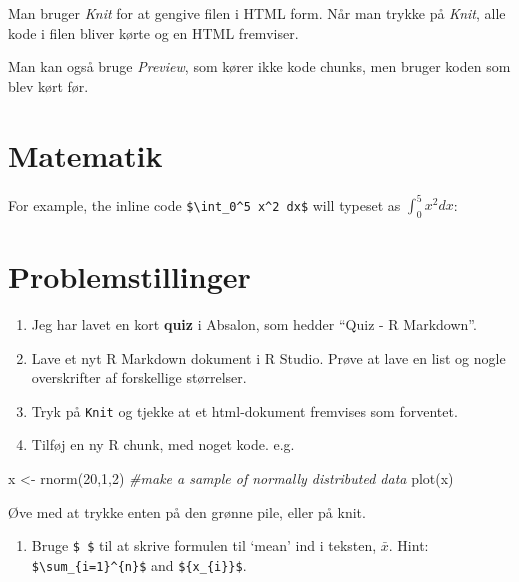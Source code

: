 \documentclass[
]{book}
\newenvironment{Shaded}{\begin{snugshade}}{\end{snugshade}}
\newcommand{\CommentTok}[1]{\textcolor[rgb]{0.56,0.35,0.01}{\textit{#1}}}
\newcommand{\DecValTok}[1]{\textcolor[rgb]{0.00,0.00,0.81}{#1}}
\newcommand{\FunctionTok}[1]{\textcolor[rgb]{0.00,0.00,0.00}{#1}}
\newcommand{\NormalTok}[1]{#1}
\newcommand{\OtherTok}[1]{\textcolor[rgb]{0.56,0.35,0.01}{#1}}
\providecommand{\tightlist}{%
  \setlength{\itemsep}{0pt}\setlength{\parskip}{0pt}}
\begin{document}
Man bruger \emph{Knit} for at gengive filen i HTML form. Når man trykke på \emph{Knit}, alle kode i filen bliver kørte og en HTML fremviser.

Man kan også bruge \emph{Preview}, som kører ikke kode chunks, men bruger koden som blev kørt før.

\hypertarget{matematik}{%
\section{Matematik}\label{matematik}}

For example, the inline code \texttt{\$\textbackslash{}int\_0\^{}5\ x\^{}2\ dx\$} will typeset as \(\int_0^5 x^2 dx\):

\hypertarget{problemstillinger-1}{%
\section{Problemstillinger}\label{problemstillinger-1}}

\begin{enumerate}
\def\labelenumi{\arabic{enumi})}
\item
  Jeg har lavet en kort \textbf{quiz} i Absalon, som hedder ``Quiz - R Markdown''.
\item
  Lave et nyt R Markdown dokument i R Studio. Prøve at lave en list og nogle overskrifter af forskellige størrelser.
\item
  Tryk på \texttt{Knit} og tjekke at et html-dokument fremvises som forventet.
\item
  Tilføj en ny R chunk, med noget kode. e.g.
\end{enumerate}

\begin{Shaded}
\begin{Highlighting}[]
\NormalTok{x }\OtherTok{\textless{}{-}} \FunctionTok{rnorm}\NormalTok{(}\DecValTok{20}\NormalTok{,}\DecValTok{1}\NormalTok{,}\DecValTok{2}\NormalTok{) }\CommentTok{\#make a sample of normally distributed data}
\FunctionTok{plot}\NormalTok{(x)}
\end{Highlighting}
\end{Shaded}

Øve med at trykke enten på den grønne pile, eller på knit.

\begin{enumerate}
\def\labelenumi{\arabic{enumi})}
\setcounter{enumi}{4}
\tightlist
\item
  Bruge \texttt{\$\ \$} til at skrive formulen til `mean' ind i teksten, \(\bar{x}\). Hint: \texttt{\$\textbackslash{}sum\_\{i=1\}\^{}\{n\}\$} and \texttt{\$\{x\_\{i\}\}\$}.
\end{enumerate}
\end{document}
